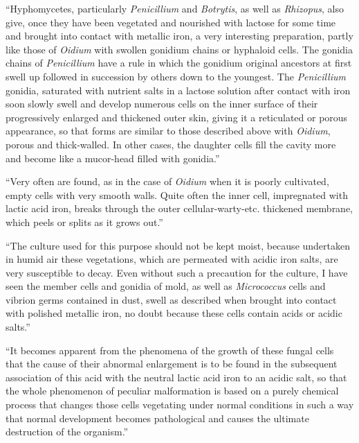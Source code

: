 \documentclass[a4paper, 12pt, oneside]{article}
\begin{document}
``Hyphomycetes, particularly \emph{Penicillium} and \emph{Botrytis}, as well as \emph{Rhizopus}, also give, once they have been vegetated and nourished with lactose for some time and brought into contact with metallic iron, a very interesting preparation, partly like those of \emph{Oidium} with swollen gonidium chains or hyphaloid cells. The gonidia chains of \emph{Penicillium} have a rule in which the gonidium original ancestors at first swell up followed in succession by others down to the youngest. The \emph{Penicillium} gonidia, saturated with nutrient salts in a lactose solution after contact with iron soon slowly swell and develop numerous cells on the inner surface of their progressively enlarged and thickened outer skin, giving it a reticulated or porous appearance, so that forms are similar to those described above with \emph{Oidium}, porous and thick-walled. In other cases, the daughter cells fill the cavity more and become like a mucor-head filled with gonidia.''

``Very often are found, as in the case of \emph{Oidium} when it is poorly cultivated, empty cells with very smooth walls. Quite often the inner cell, impregnated with lactic acid iron, breaks through the outer cellular-warty-etc. thickened membrane, which peels or splits as it grows out.''

``The culture used for this purpose should not be kept moist, because undertaken in humid air these vegetations, which are permeated with acidic iron salts, are very susceptible to decay. Even without such a precaution for the culture, I have seen the member cells and gonidia of mold, as well as \emph{Micrococcus} cells and vibrion germs contained in dust, swell as described when brought into contact with polished metallic iron, no doubt because these cells contain acids or acidic salts.''

``It becomes apparent from the phenomena of the growth of these fungal cells that the cause of their abnormal enlargement is to be found in the subsequent association of this acid with the neutral lactic acid iron to an acidic salt, so that the whole phenomenon of peculiar malformation is based on a purely chemical process that changes those cells vegetating under normal conditions in such a way that normal development becomes pathological and causes the ultimate destruction of the organism.''
\end{document}
